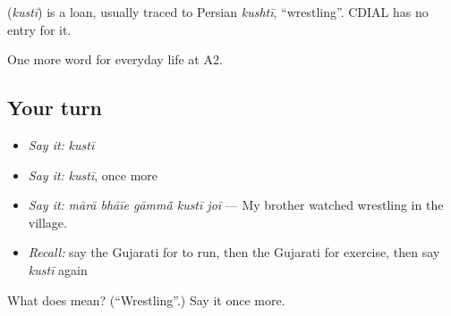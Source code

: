 \begin{cousinweb}
\textbf{} (\emph{kustī}) is a loan, usually traced to Persian \emph{kushtī}, \textquotedblleft{}wrestling\textquotedblright{}. CDIAL has no entry for it.
\end{cousinweb}

\begin{grammarlens}[title={What you've built}]
One more word for everyday life at A2.
\end{grammarlens}

\subsection*{Your turn}
\begin{itemize}
\raggedright
  \item \emph{Say it:} \emph{kustī}
  \item \emph{Say it:} \emph{kustī}, once more
  \item \emph{Say it:} \emph{mārā bhāīe gāmmā̃ kustī joī} — My brother watched wrestling in the village.
  \item \emph{Recall:} say the Gujarati for to run, then the Gujarati for exercise, then say \emph{kustī} again
\end{itemize}

\begin{tcolorbox}[breakable,colback=teal!4,colframe=teal!35!black,title={Before you move on}]
What does  mean? (\textquotedblleft{}Wrestling\textquotedblright{}.) Say it once more.
\end{tcolorbox}
